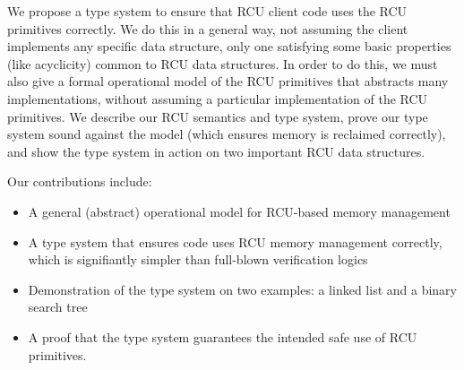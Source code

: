 We propose a type system to ensure that RCU client code uses the RCU primitives correctly.
We do this in a general way, not assuming the client implements any specific data structure, only one satisfying some basic properties (like acyclicity) common to RCU data structures.  In order to do this, we must also give a formal operational model of the RCU primitives that abstracts many implementations, without assuming a particular implementation of the RCU primitives.
We describe our RCU semantics and type system, prove our type system sound against the model (which ensures memory is reclaimed correctly), and show the type system in action on two important RCU data structures.

Our contributions include:
\begin{itemize}
\item A general (abstract) operational model for RCU-based memory management
\item A type system that ensures code uses RCU memory management correctly, which is signifiantly simpler than full-blown verification logics
\item Demonstration of the type system on two examples: a linked list and a binary search tree  
\item A proof that the type system guarantees the intended safe use of RCU primitives.
\end{itemize}
